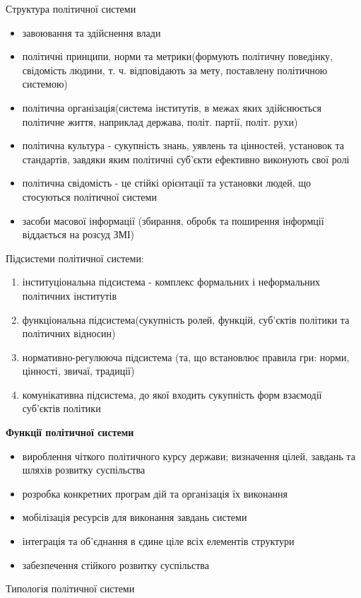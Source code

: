 Структура політичної системи
\begin{itemize}
\item завоювання та здійснення влади
\item політичні принципи, норми та метрики(формують політичну поведінку, свідомість людини, т. ч. відповідають за мету, поставлену політичною системою)
\item політична організація(система інститутів, в межах яких здійснюється політичне життя, наприклад держава, політ. партії, політ. рухи)
\item політична культура - сукупність знань, уявлень та цінностей, установок та стандартів, завдяки яким політичні суб’єкти ефективно виконують свої ролі 
\item політична свідомість - це стійкі орієнтації та установки людей, що стосуються політичної системи
\item засоби масової інформації (збирання, обробк та поширення інформції віддається на розсуд ЗМІ)
\end{itemize}
Підсистеми політичної системи:
\begin{enumerate}
\item інституціональна підсистема - комплекс формальних і неформальних політичних інститутів
\item функціональна підсистема(сукупність ролей, функцій, суб’єктів політики та політичних відносин)
\item нормативно-регулююча підсистема (та, що встановлює правила гри: норми, цінності, звичаї, традиції)
\item комунікативна підсистема, до якої входить сукупність форм взаємодії суб’єктів політики
\end{enumerate}
\textbf{Функції політичної системи}
\begin{itemize}
\item вироблення чіткого політичного курсу держави; визначення цілей, завдань та шляхів розвитку суспільства
\item розробка конкретних програм дій та організація їх виконання
\item мобілізація ресурсів для виконання завдань системи
\item інтеграція та об’єднання в єдине ціле всіх елементів структури 
\item забезпечення стійкого розвитку суспільства
\end{itemize}
Типологія політичної системи

